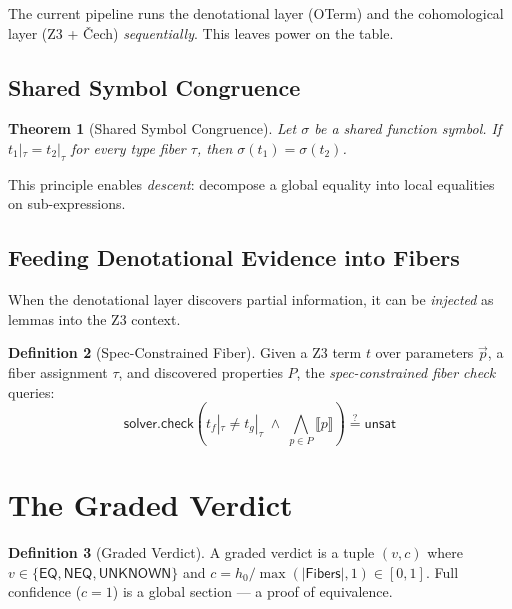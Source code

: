 \documentclass[11pt,a4paper]{report}
\theoremstyle{definition}
\newtheorem{definition}{Definition}[chapter]
\theoremstyle{plain}
\newtheorem{theorem}[definition]{Theorem}
\begin{document}
The current pipeline runs the denotational layer (OTerm) and the
cohomological layer (Z3 + \v{C}ech) \emph{sequentially}.  This
leaves power on the table.

\subsection{Shared Symbol Congruence}

\begin{theorem}[Shared Symbol Congruence]
\label{thm:shared-equiv}
Let $\sigma$ be a shared function symbol.  If
$t_1 |_\tau = t_2 |_\tau$ for every type fiber $\tau$, then
$\sigma(t_1) = \sigma(t_2)$.
\end{theorem}

This principle enables \emph{descent}: decompose a global equality
into local equalities on sub-expressions.

\subsection{Feeding Denotational Evidence into Fibers}

When the denotational layer discovers partial information,
it can be \emph{injected} as lemmas into the Z3 context.

\begin{definition}[Spec-Constrained Fiber]
Given a Z3 term $t$ over parameters $\vec{p}$, a fiber
assignment $\tau$, and discovered properties $P$, the
\emph{spec-constrained fiber check} queries:
\[
  \mathsf{solver.check}\!\left(
    t_f |_\tau \neq t_g |_\tau \;\wedge\;
    \bigwedge_{p \in P} \llbracket p \rrbracket
  \right)
  \stackrel{?}{=} \mathsf{unsat}
\]
\end{definition}


\section{The Graded Verdict}
\label{sec:fallback-graded}

\begin{definition}[Graded Verdict]
\label{def:graded-verdict}
A graded verdict is a tuple $(v, c)$ where
$v \in \{\mathsf{EQ}, \mathsf{NEQ}, \mathsf{UNKNOWN}\}$
and $c = h_0 / \max(|\mathsf{Fibers}|, 1) \in [0,1]$.
Full confidence ($c = 1$) is a global section ---
a proof of equivalence.
\end{definition}
\end{document}
